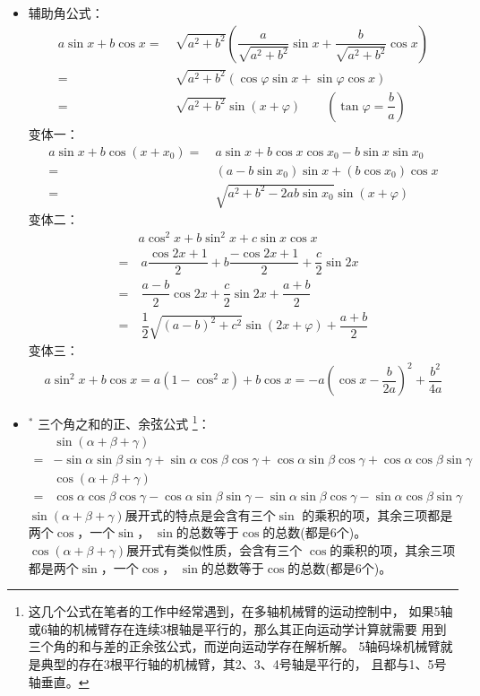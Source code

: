 \begin{itemize}[leftmargin=\inteval{\myitemleftmargin}pt,itemsep=
   \inteval{\myitemitempsep}pt,topsep=\inteval{\myitemtopsep}pt]
\item 辅助角公式：
\begin{align*}
a\sin x+b\cos x 
=&\  \sqrt{a^2+b^2}\left(\dfrac{a}{\sqrt{a^2+b^2}}\sin x+\dfrac{b}{\sqrt{a^2+b^2}}\cos x \right) \\
=&\  \sqrt{a^2+b^2}\left(\cos\varphi\sin x+\sin\varphi\cos x \right) \\
=&\  \sqrt{a^2+b^2}\sin(x+\varphi) \quad\quad 
\left(\tan \varphi=\dfrac{b}{a}\right)
\end{align*}
变体一：
\begin{align*}
a\sin x+b\cos (x+x_0) 
=&\  a\sin x+b\cos x\cos x_0-b\sin x\sin x_0 \\
=&\  (a-b\sin x_0)\sin x+(b\cos x_0)\cos x \\
=&\  \sqrt{a^2+b^2-2ab\sin x_0}\sin(x+\varphi) 
\end{align*}
变体二：
\begin{align*}
&a\cos^2x+b\sin^2x+c\sin x\cos x \\
=&\  a\dfrac{\cos2x+1}{2} +b\dfrac{-\cos2x+1}{2}+\dfrac{c}{2}\sin2x \\
=&\  \dfrac{a-b}{2}\cos2x+\dfrac{c}{2}\sin2x+\dfrac{a+b}{2} \\
=&\  \dfrac{1}{2}\sqrt{(a-b)^2+c^2}\sin(2x+\varphi)+\dfrac{a+b}{2}
\end{align*}
变体三：
\begin{align*}
a\sin^2x+b\cos x=a(1-\cos^2x)+b\cos x=
-a\left( \cos x-\dfrac{b}{2a}\right) ^2+\dfrac{b^2}{4a}
\end{align*}

\item $ ^* $ 三个角之和的正、余弦公式
\footnote{这几个公式在笔者的工作中经常遇到，在多轴机械臂的运动控制中，
    如果5轴或6轴的机械臂存在连续3根轴是平行的，那么其正向运动学计算就需要
    用到三个角的和与差的正余弦公式，而逆向运动学存在解析解。
    5轴码垛机械臂就是典型的存在3根平行轴的机械臂，其2、3、4号轴是平行的，
    且都与1、5号轴垂直。}：
\begin{align*}
    &\sin(\alpha+\beta+\gamma)\\
    =&-\sin\alpha\sin\beta\sin\gamma
    +\sin \alpha \cos \beta \cos \gamma  + \cos \alpha \sin \beta 
    \cos \gamma + \cos \alpha \cos \beta \sin \gamma  \\
    &\cos(\alpha+\beta+\gamma)\\ 
    =& \cos \alpha \cos \beta \cos\gamma
    -\cos\alpha  \sin \beta \sin \gamma - \sin \alpha \sin \beta 
    \cos \gamma - \sin \alpha \cos \beta \sin \gamma
\end{align*}
$ \sin(\alpha+\beta+\gamma) $展开式的特点是会含有三个$ \sin $
的乘积的项，其余三项都是两个$ \cos $，一个$ \sin $，
$ \sin $的总数等于$ \cos $的总数(都是6个)。
$ \cos(\alpha+\beta+\gamma) $展开式有类似性质，会含有三个
$ \cos $的乘积的项，其余三项都是两个$ \sin $，一个$ \cos $，
$ \sin $的总数等于$ \cos $的总数(都是6个)。


\end{itemize}
